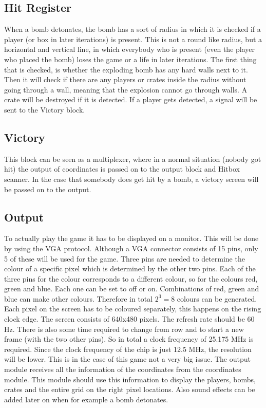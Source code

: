  \subsection{Hit Register}
 When a bomb detonates, the bomb has a sort of radius in which it is checked if a player (or box in later iterations) is present. This is not a round like radius, but a horizontal and vertical line, in which everybody who is present (even the player who placed the bomb) loses the game or a life in later iterations. The first thing that is checked, is whether the exploding bomb has any hard walls next to it. %
 Then it will check if there are any players or crates inside the radius without going through a wall, meaning that the explosion cannot go through walls. A crate will be destroyed if it is detected. If a player gets detected, a signal will be sent to the Victory block.

\subsection{Victory}
This block can be seen as a multiplexer, where in a normal situation (nobody got hit) the output of coordinates is passed on to the output block and Hitbox scanner. In the case that somebody does get hit by a bomb, a victory screen will be passed on to the output. 
 
 \subsection{Output}\label{Output}
 To actually play the game it has to be displayed on a monitor. This will be done by using the VGA protocol. Although a VGA connector consists of 15 pins, only 5 of these will be used for the game. Three pins are needed to determine the colour of a specific pixel which is determined by the other two pins. Each of the three pins for the colour corresponds to a different colour, so for the colours red, green and blue. Each one can be set to off or on. Combinations of red, green and blue can make other colours. Therefore in total $2^3 = 8$ colours can be generated. Each pixel on the screen has to be coloured separately, this happens on the rising clock edge. The screen consists of 640x480 pixels. The refresh rate should be 60 Hz. There is also some time required to change from row and to start a new frame (with the two other pins). So in total a clock frequency of 25.175 MHz is required. Since the clock frequency of the chip is just 12.5 MHz, the resolution will be lower. This is in the case of this game not a very big issue. 
 The output module receives all the information of the coordinates from the coordinates module. This module should use this information to display the players, bombs, crates and the entire grid on the right pixel locations. Also sound effects can be added later on when for example a bomb detonates. 